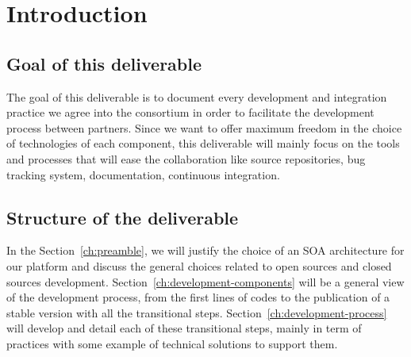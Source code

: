 \chapter{Introduction}
\label{ch:introduction}

\section{Goal of this deliverable}
\label{sec:goal-of-this-deliverable}

The goal of this deliverable is to document every development and integration practice we agree
into the consortium in order to facilitate the development process between partners.
Since we want to offer maximum freedom in the choice of technologies of each component, this
deliverable will mainly focus on the tools and processes that will ease the collaboration like
source repositories, bug tracking system, documentation, continuous integration.

\section{Structure of the deliverable}
\label{sec:structure-of-the-deliverable}

In the Section~\ref{ch:preamble}, we will justify the choice of an SOA architecture for our
\learnpad platform and discuss the general choices related to open sources and closed sources
development. Section~\ref{ch:development-components} will be a general view of the development
process, from the first lines of codes to the publication of a stable version with all the
transitional steps. Section~\ref{ch:development-process} will develop and detail each of these
transitional steps, mainly in term of practices with some example of technical solutions to support
them.
